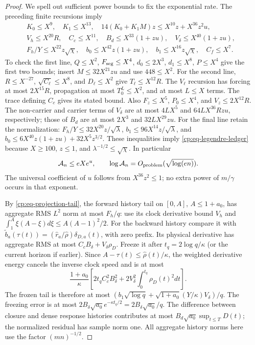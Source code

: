 \begin{proof}
We spell out sufficient power bounds to fix the exponential rate.
The preceding finite recursions imply
\begin{align}
 &K_0\le X^9,\quad K_1\le X^{13},\quad
 14(K_0+K_1M)z\le X^{10}z+X^{36}z^2u,\nonumber\\
 &V_h\le X^{20}R,\quad C_c\le X^{11},\quad
 B_d\le X^{33}(1+zu),\quad V_\delta\le X^{40}(1+zu),\nonumber\\
 &F_h/Y\le X^{22}z\sqrt\chi,\quad
 b_0\le X^{42}z(1+zu),\quad b_1\le X^{16}z\sqrt\chi,
 \quad C_f\le X^7.
 \label{cp:eq-legendre-ledger}
\end{align}
To check the first line, $Q\le X^2$, $F_{\rm seg}\le X^4$,
$d_0\le2X^3$, $d_1\le X^8$, $P\le X^4$ give the first two
bounds; insert $M\le32X^{21}zu$ and use $448\le X^2$.
For the second line, $R\le X^{-27}$, $\sqrt{C_\ell}\le X^8$,
and $D_\ell\le X^2$ give $T_\ell\le X^{12}R$.
The $V_\ell$ recursion has forcing at most $2X^{15}R$, propagation
at most $T_0^L\le X^2$, and at most $L\le X$ terms.
The trace defining $C_c$ gives its stated bound.
Also $F_z\le X^5$, $P_0\le X^4$, and $V_z\le2X^{12}R$.
The non-carrier and carrier terms of $V_\delta$ are at most
$4LX^5$ and $64LX^{36}Rzu$, respectively; those of $B_d$ are
at most $2X^3$ and $32LX^{29}zu$.
For the final line retain the normalization:
$F_h/Y\le32X^{20}z/\sqrt\lambda$,
$b_1\le96X^{14}z/\sqrt\lambda$, and
$b_0\le6X^{40}z(1+zu)+32X^5z^{3/2}$.
These inequalities imply \eqref{cp:eq-legendre-ledger} because
$X\ge100$, $z\le1$, and $\lambda^{-1/2}\le\sqrt\chi$.
In particular
\begin{equation}
 \mathcal A_n\le eX e^u,
 \qquad \log\mathcal A_n=O_{\rm problem}(\sqrt{\log(en)}).
 \label{cp:eq-legendre-exponent}
\end{equation}
The universal coefficient of $u$ follows from $X^{36}z^2\le1$;
no extra power of $m/\gamma$ occurs in that exponent.

By \eqref{cp:eq-projection-tail}, the forward history tail on
$[0,A]$, $A\le1+a_0$, has aggregate RMS $L^2$ norm at most $F_h/q$:
use its clock derivative bound $V_h$ and
$\int_1^A\xi(A-\xi)d\xi\le A(A-1)^2/2$.
For the backward history compare it with
$\widetilde b_a(\tau(t))=
(\widehat r_a/\widehat\rho)\delta_{D,a}(t)$, with zero prefix.
Its physical derivative has aggregate RMS at most
$C_cB_\delta+V_\delta\rho_D$.
Freeze it after $t_q=2\log q/\kappa$ (or the current horizon if
earlier).  Since $A-\tau(t)\le\widehat\rho(t)/\kappa$, the weighted
derivative energy cancels the inverse clock speed and is at most
\[
 \frac{1+a_0}{\kappa}
 \left[2t_qC_c^2B_\delta^2+
       2V_\delta^2\int_0^{t_q}\rho_D(t)^2dt\right].
\]
The frozen tail is therefore at most
$(b_1\sqrt{\log q}+\sqrt{1+a_0}(Y/\kappa)V_\delta)/q$.
The freezing error is at most
$2B_\delta\sqrt{a_0}e^{-\kappa t_q/2}
=2B_\delta\sqrt{a_0}/q$.
The difference between closure and dense response histories contributes
at most $B_d\sqrt{a_0}\sup_{t\le T}D(t)$; the normalized residual has
sample norm one.  All aggregate history norms here use the factor
$(mn)^{-1/2}$.


\end{proof}
